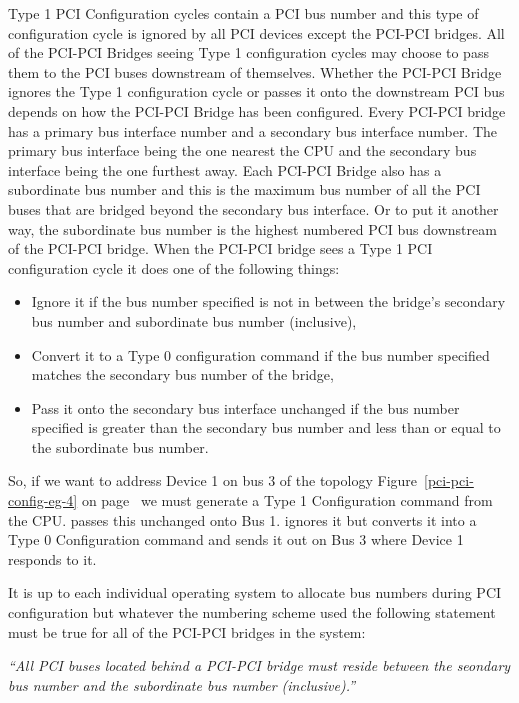 Type 1 PCI Configuration cycles contain a PCI bus number and this type
of configuration cycle is ignored by all PCI devices except the PCI-PCI
bridges.
All of the PCI-PCI Bridges seeing Type 1 configuration cycles may choose
to pass them to the PCI buses downstream of themselves.
Whether the PCI-PCI Bridge ignores the Type 1 configuration cycle or
passes it onto the downstream PCI bus depends on how the PCI-PCI Bridge has been configured.
Every PCI-PCI bridge has a primary bus interface number 
and a secondary bus interface number.
The primary bus interface being the one nearest the CPU and the secondary
bus interface being the one furthest away.
Each PCI-PCI Bridge also has a subordinate bus number and this is
the maximum bus number of  all the PCI buses that are bridged beyond the secondary bus 
interface.
Or to put it another way, the subordinate bus number is
the highest numbered PCI bus downstream of the PCI-PCI bridge.
When the PCI-PCI bridge sees a Type 1 PCI configuration cycle it does one of the 
following things:
\begin{itemize}
     \item  Ignore it if the bus number specified is not in 
        between the bridge's secondary bus number and 
        subordinate bus number (inclusive),

     \item  Convert it to a Type 0 configuration command if 
        the bus number specified matches the secondary bus 
        number of the bridge,

     \item  Pass it onto the secondary bus interface unchanged 
        if the bus number specified is greater than the 
        secondary bus number and less than or equal to the 
        subordinate bus number.
\end{itemize}
So, if we want to address Device 1 on bus 3 of the 
topology Figure~\ref{pci-pci-config-eg-4} on page~\pageref{pci-pci-config-eg-4}
we must generate a Type 1 Configuration command from the CPU. 
 passes this unchanged onto Bus 1.  ignores it but  
converts it into a Type 0 Configuration command and sends 
it out on Bus 3 where Device 1 responds to it. 

It is up to each individual operating system to allocate bus 
numbers during PCI configuration but whatever the 
numbering scheme used the following statement must be true for 
all of the PCI-PCI bridges in the system:

   {\em``All PCI buses located behind a PCI-PCI bridge must 
   reside between the seondary bus number and the 
   subordinate bus number (inclusive).''}


